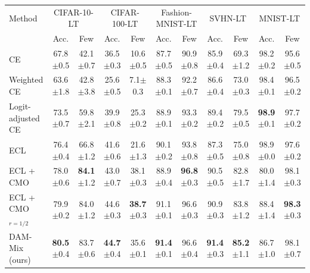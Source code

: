\begin{tabular}{lcccccccccc}
\toprule
Method & \multicolumn{2}{c}{CIFAR-10-LT} & \multicolumn{2}{c}{CIFAR-100-LT} & \multicolumn{2}{c}{Fashion-MNIST-LT} & \multicolumn{2}{c}{SVHN-LT} & \multicolumn{2}{c}{MNIST-LT} \\
 & Acc. & Few & Acc. & Few & Acc. & Few & Acc. & Few & Acc. & Few \\
\midrule
CE & 67.8{\scriptsize$\pm$0.5} & 42.1{\scriptsize$\pm$0.7} & 36.5{\scriptsize$\pm$0.3} & 10.6{\scriptsize$\pm$0.5} & 87.7{\scriptsize$\pm$0.5} & 90.9{\scriptsize$\pm$0.8} & 85.9{\scriptsize$\pm$0.4} & 69.3{\scriptsize$\pm$1.2} & 98.2{\scriptsize$\pm$0.2} & 95.6{\scriptsize$\pm$0.5} \\
Weighted CE & 63.6{\scriptsize$\pm$1.8} & 42.8{\scriptsize$\pm$3.8} & 25.6{\scriptsize$\pm$0.5} & 7.1{\scriptsize$\pm$0.3} & 88.3{\scriptsize$\pm$0.1} & 92.2{\scriptsize$\pm$0.7} & 86.6{\scriptsize$\pm$0.4} & 73.0{\scriptsize$\pm$0.3} & 98.4{\scriptsize$\pm$0.1} & 96.5{\scriptsize$\pm$0.2} \\
Logit-adjusted CE & 73.5{\scriptsize$\pm$0.7} & 59.8{\scriptsize$\pm$2.1} & 39.9{\scriptsize$\pm$0.8} & 25.3{\scriptsize$\pm$0.2} & 88.9{\scriptsize$\pm$0.1} & 93.3{\scriptsize$\pm$0.2} & 89.4{\scriptsize$\pm$0.2} & 79.5{\scriptsize$\pm$0.5} & \textbf{98.9}{\scriptsize$\pm$0.1} & 97.7{\scriptsize$\pm$0.2} \\
ECL & 76.4{\scriptsize$\pm$0.4} & 66.8{\scriptsize$\pm$1.2} & 41.6{\scriptsize$\pm$0.6} & 21.6{\scriptsize$\pm$1.3} & 90.1{\scriptsize$\pm$0.2} & 93.8{\scriptsize$\pm$0.8} & 87.3{\scriptsize$\pm$0.5} & 75.0{\scriptsize$\pm$0.8} & 98.9{\scriptsize$\pm$0.0} & 97.6{\scriptsize$\pm$0.2} \\
ECL + CMO & 78.0{\scriptsize$\pm$0.6} & \textbf{84.1}{\scriptsize$\pm$1.2} & 43.0{\scriptsize$\pm$0.7} & 38.1{\scriptsize$\pm$0.3} & 88.9{\scriptsize$\pm$0.4} & \textbf{96.8}{\scriptsize$\pm$0.3} & 90.5{\scriptsize$\pm$0.5} & 82.8{\scriptsize$\pm$1.7} & 80.0{\scriptsize$\pm$1.4} & 98.1{\scriptsize$\pm$0.3} \\
ECL + CMO$_{r=1/2}$ & 79.9{\scriptsize$\pm$0.2} & 84.0{\scriptsize$\pm$1.2} & 44.6{\scriptsize$\pm$0.3} & \textbf{38.7}{\scriptsize$\pm$0.3} & 91.1{\scriptsize$\pm$0.1} & 96.6{\scriptsize$\pm$0.3} & 90.9{\scriptsize$\pm$0.3} & 83.8{\scriptsize$\pm$1.2} & 88.4{\scriptsize$\pm$1.4} & \textbf{98.3}{\scriptsize$\pm$0.3} \\
\midrule
DAM-Mix (ours) & \textbf{80.5}{\scriptsize$\pm$0.4} & 83.7{\scriptsize$\pm$0.6} & \textbf{44.7}{\scriptsize$\pm$0.4} & 35.6{\scriptsize$\pm$0.1} & \textbf{91.4}{\scriptsize$\pm$0.1} & 96.6{\scriptsize$\pm$0.4} & \textbf{91.4}{\scriptsize$\pm$0.3} & \textbf{85.2}{\scriptsize$\pm$1.1} & 86.7{\scriptsize$\pm$1.0} & 98.1{\scriptsize$\pm$0.7} \\
\bottomrule
\end{tabular}
